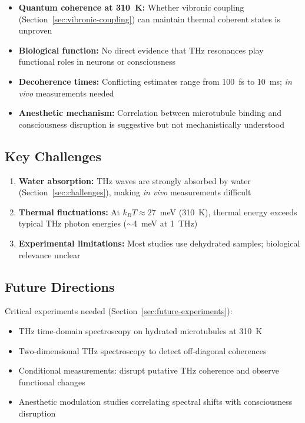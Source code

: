 \begin{itemize}
\begin{itemize}
\item \textbf{Quantum coherence at 310~K:} Whether vibronic coupling (Section~\ref{sec:vibronic-coupling}) can maintain thermal coherent states is unproven
\item \textbf{Biological function:} No direct evidence that THz resonances play functional roles in neurons or consciousness
\item \textbf{Decoherence times:} Conflicting estimates range from 100~fs to 10~ms; \textit{in vivo} measurements needed
\item \textbf{Anesthetic mechanism:} Correlation between microtubule binding and consciousness disruption is suggestive but not mechanistically understood
\end{itemize}

\subsection{Key Challenges}

\begin{enumerate}
\item \textbf{Water absorption:} THz waves are strongly absorbed by water (Section~\ref{sec:challenges}), making \textit{in vivo} measurements difficult
\item \textbf{Thermal fluctuations:} At $k_B T \approx 27$~meV (310~K), thermal energy exceeds typical THz photon energies ($\sim$4~meV at 1~THz)
\item \textbf{Experimental limitations:} Most studies use dehydrated samples; biological relevance unclear
\end{enumerate}

\subsection{Future Directions}

Critical experiments needed (Section~\ref{sec:future-experiments}):
\begin{itemize}
\item THz time-domain spectroscopy on hydrated microtubules at 310~K
\item Two-dimensional THz spectroscopy to detect off-diagonal coherences
\item Conditional measurements: disrupt putative THz coherence and observe functional changes
\item Anesthetic modulation studies correlating spectral shifts with consciousness disruption
\end{itemize}


\end{itemize}
